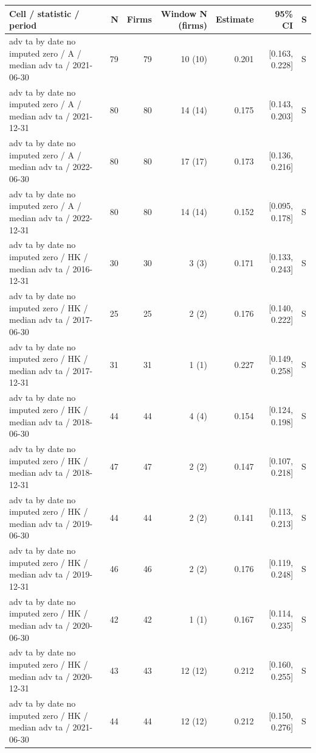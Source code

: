 \begin{threeparttable}
\begin{tabular}{p{5.7cm}rrrrrl}
\toprule
Cell / statistic / period & N & Firms & Window N (firms) & Estimate & 95\% CI & S \\
\midrule
adv ta by date no imputed zero / A / median adv ta / 2021-06-30 & 79 & 79 & 10 (10) & 0.201 & [0.163, 0.228] & S \\
adv ta by date no imputed zero / A / median adv ta / 2021-12-31 & 80 & 80 & 14 (14) & 0.175 & [0.143, 0.203] & S \\
adv ta by date no imputed zero / A / median adv ta / 2022-06-30 & 80 & 80 & 17 (17) & 0.173 & [0.136, 0.216] &  \\
adv ta by date no imputed zero / A / median adv ta / 2022-12-31 & 80 & 80 & 14 (14) & 0.152 & [0.095, 0.178] & S \\
adv ta by date no imputed zero / HK / median adv ta / 2016-12-31 & 30 & 30 & 3 (3) & 0.171 & [0.133, 0.243] & S \\
adv ta by date no imputed zero / HK / median adv ta / 2017-06-30 & 25 & 25 & 2 (2) & 0.176 & [0.140, 0.222] & S \\
adv ta by date no imputed zero / HK / median adv ta / 2017-12-31 & 31 & 31 & 1 (1) & 0.227 & [0.149, 0.258] & S \\
adv ta by date no imputed zero / HK / median adv ta / 2018-06-30 & 44 & 44 & 4 (4) & 0.154 & [0.124, 0.198] & S \\
adv ta by date no imputed zero / HK / median adv ta / 2018-12-31 & 47 & 47 & 2 (2) & 0.147 & [0.107, 0.218] & S \\
adv ta by date no imputed zero / HK / median adv ta / 2019-06-30 & 44 & 44 & 2 (2) & 0.141 & [0.113, 0.213] & S \\
adv ta by date no imputed zero / HK / median adv ta / 2019-12-31 & 46 & 46 & 2 (2) & 0.176 & [0.119, 0.248] & S \\
adv ta by date no imputed zero / HK / median adv ta / 2020-06-30 & 42 & 42 & 1 (1) & 0.167 & [0.114, 0.235] & S \\
adv ta by date no imputed zero / HK / median adv ta / 2020-12-31 & 43 & 43 & 12 (12) & 0.212 & [0.160, 0.255] & S \\
adv ta by date no imputed zero / HK / median adv ta / 2021-06-30 & 44 & 44 & 12 (12) & 0.212 & [0.150, 0.276] & S \\
\bottomrule
\end{tabular}
\begin{tablenotes}[flushleft]\footnotesize

\end{tablenotes}
\end{threeparttable}
